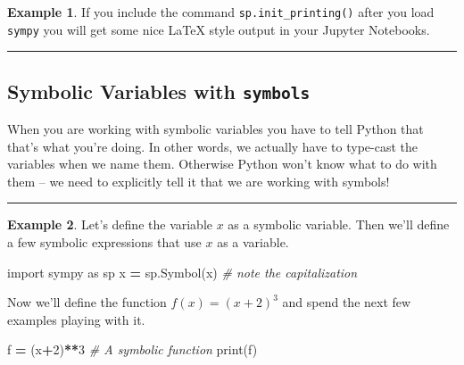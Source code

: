 \documentclass[
]{book}
\newenvironment{Shaded}{\begin{snugshade}}{\end{snugshade}}
\newcommand{\BuiltInTok}[1]{#1}
\newcommand{\CommentTok}[1]{\textcolor[rgb]{0.56,0.35,0.01}{\textit{#1}}}
\newcommand{\DecValTok}[1]{\textcolor[rgb]{0.00,0.00,0.81}{#1}}
\newcommand{\ImportTok}[1]{#1}
\newcommand{\NormalTok}[1]{#1}
\newcommand{\OperatorTok}[1]{\textcolor[rgb]{0.81,0.36,0.00}{\textbf{#1}}}
\newcommand{\StringTok}[1]{\textcolor[rgb]{0.31,0.60,0.02}{#1}}
\theoremstyle{definition}
\theoremstyle{definition}
\newtheorem{example}{Example}[chapter]
\theoremstyle{definition}
\theoremstyle{remark}
\begin{document}
\begin{example}
\protect\hypertarget{exm:unnamed-chunk-772}{}{\label{exm:unnamed-chunk-772} }If you include the command \texttt{sp.init\_printing()} after you load \texttt{sympy} you will get some nice LaTeX style output in your Jupyter Notebooks.
\end{example}

\begin{center}\rule{0.5\linewidth}{0.5pt}\end{center}

\hypertarget{symbolic-variables-with-symbols}{%
\subsection{\texorpdfstring{Symbolic Variables with \texttt{symbols}}{Symbolic Variables with symbols}}\label{symbolic-variables-with-symbols}}

When you are working with symbolic variables you have to tell Python that that's what you're doing. In other words, we actually have to type-cast the variables when we name them. Otherwise Python won't know what to do with them -- we need to explicitly tell it that we are working with symbols!

\begin{center}\rule{0.5\linewidth}{0.5pt}\end{center}

\begin{example}
\protect\hypertarget{exm:unnamed-chunk-773}{}{\label{exm:unnamed-chunk-773} }Let's define the variable \(x\) as a symbolic variable. Then we'll define a few symbolic expressions that use \(x\) as a variable.
\end{example}

\begin{Shaded}
\begin{Highlighting}[]
\ImportTok{import}\NormalTok{ sympy }\ImportTok{as}\NormalTok{ sp}
\NormalTok{x }\OperatorTok{=}\NormalTok{ sp.Symbol(}\StringTok{\textquotesingle{}x\textquotesingle{}}\NormalTok{) }\CommentTok{\# note the capitalization}
\end{Highlighting}
\end{Shaded}

Now we'll define the function \(f(x) = (x+2)^3\) and spend the next few
examples playing with it.

\begin{Shaded}
\begin{Highlighting}[]
\NormalTok{f }\OperatorTok{=}\NormalTok{ (x}\OperatorTok{+}\DecValTok{2}\NormalTok{)}\OperatorTok{**}\DecValTok{3} \CommentTok{\# A symbolic function}
\BuiltInTok{print}\NormalTok{(f)}
\end{Highlighting}
\end{Shaded}
\end{document}
